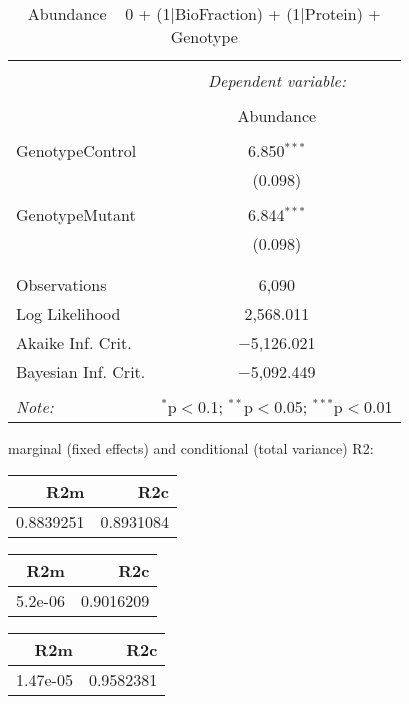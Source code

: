 \documentclass[11pt]{report}
\begin{document}
\begin{table}[!htbp] \centering 
  \caption{Abundance ~ 0 + (1|BioFraction) + (1|Protein) + Genotype} 
  \label{} 
\begin{tabular}{@{\extracolsep{5pt}}lc} 
\\[-1.8ex]\hline 
\hline \\[-1.8ex] 
 & \multicolumn{1}{c}{\textit{Dependent variable:}} \\ 
\cline{2-2} 
\\[-1.8ex] & Abundance \\ 
\hline \\[-1.8ex] 
 GenotypeControl & 6.850$^{***}$ \\ 
  & (0.098) \\ 
  & \\ 
 GenotypeMutant & 6.844$^{***}$ \\ 
  & (0.098) \\ 
  & \\ 
\hline \\[-1.8ex] 
Observations & 6,090 \\ 
Log Likelihood & 2,568.011 \\ 
Akaike Inf. Crit. & $-$5,126.021 \\ 
Bayesian Inf. Crit. & $-$5,092.449 \\ 
\hline 
\hline \\[-1.8ex] 
\textit{Note:}  & \multicolumn{1}{r}{$^{*}$p$<$0.1; $^{**}$p$<$0.05; $^{***}$p$<$0.01} \\ 
\end{tabular} 
\end{table} 
marginal (fixed effects) and conditional (total variance) R2:

\begin{tabular}{r|r}
\hline
R2m & R2c\\
\hline
0.8839251 & 0.8931084\\
\hline
\end{tabular}

\begin{tabular}{r|r}
\hline
R2m & R2c\\
\hline
5.2e-06 & 0.9016209\\
\hline
\end{tabular}

\begin{tabular}{r|r}
\hline
R2m & R2c\\
\hline
1.47e-05 & 0.9582381\\
\hline
\end{tabular}
\end{document}
